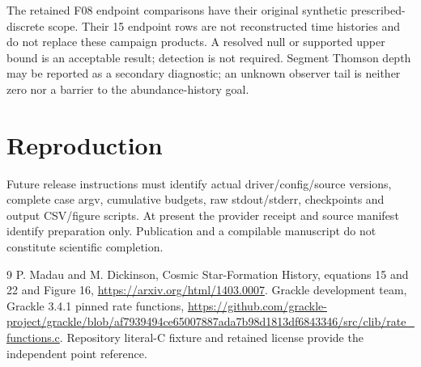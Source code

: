 \documentclass[11pt]{article}
\begin{document}
The retained F08 endpoint comparisons have their original synthetic prescribed-discrete scope. Their 15 endpoint rows are not reconstructed time histories and do not replace these campaign products. A resolved null or supported upper bound is an acceptable result; detection is not required. Segment Thomson depth may be reported as a secondary diagnostic; an unknown observer tail is neither zero nor a barrier to the abundance-history goal.

\section{Reproduction}
Future release instructions must identify actual driver/config/source versions, complete case argv, cumulative budgets, raw stdout/stderr, checkpoints and output CSV/figure scripts. At present the provider receipt and source manifest identify preparation only. Publication and a compilable manuscript do not constitute scientific completion.
\begin{thebibliography}{9}
 P. Madau and M. Dickinson, Cosmic Star-Formation History, equations 15 and 22 and Figure 16, \url{https://arxiv.org/html/1403.0007}.
 Grackle development team, Grackle 3.4.1 pinned rate functions, \url{https://github.com/grackle-project/grackle/blob/af7939494ce65007887ada7b98d1813df6843346/src/clib/rate_functions.c}. Repository literal-C fixture and retained license provide the independent point reference.
\end{thebibliography}
\end{document}
